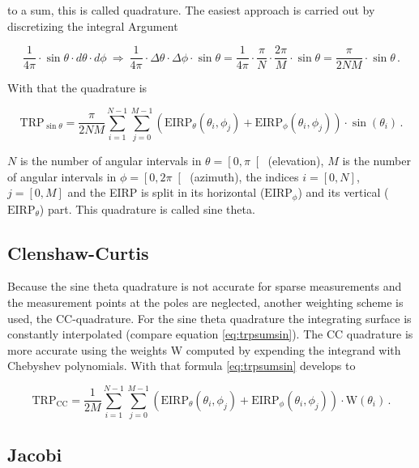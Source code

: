 to a sum, this is called quadrature. The easiest approach is carried out by discretizing the integral Argument \cite{ctiaat}

\begin{equation}
\frac{1}{4\pi}\cdot\sin\theta\cdot d\theta\cdot d\phi \ \Rightarrow\ \frac{1}{4\pi}\cdot \Delta\theta\cdot \Delta\phi\cdot\sin\theta = \frac{1}{4\pi}\cdot \frac{\pi}{N}\cdot \frac{2\pi}{M}\cdot\sin\theta=\frac{\pi}{2NM}\cdot\sin\theta\,.
\end{equation}

With that the quadrature is

\begin{equation}
\text{TRP}_{\sin\theta} = \frac{\pi}{2NM}\sum^{N-1}_{i=1}\sum^{M-1}_{j=0}\left(\text{EIRP}_\theta\left(\theta_i,\phi_j\right)+\text{EIRP}_\phi\left(\theta_i,\phi_j\right)\right)\cdot\sin\left(\theta_i\right)\,.
\label{eq:trpsumsin}
\end{equation}

$N$ is the number of angular intervals in $\theta=\left[0,\pi\right[$ (elevation), $M$ is the number of angular intervals in $\phi=\left[0,2\pi\right[$ (azimuth), the indices $i=\left[0,N\right]$, $j=\left[0,M\right]$ and the \ac{EIRP} is split in its horizontal ($\text{EIRP}_\phi$) and its vertical ($\text{EIRP}_\theta$) part. This quadrature is called sine theta.

\subsection{Clenshaw-Curtis}

Because the sine theta quadrature is not accurate for sparse measurements and the measurement points at the poles are neglected, another weighting scheme is used, the \ac{CC}-quadrature. For the sine theta quadrature the integrating surface is constantly interpolated (compare equation \ref{eq:trpsumsin}). The \ac{CC} quadrature is more accurate using the weights W computed by expending the integrand with Chebyshev polynomials. With that formula \ref{eq:trpsumsin} develops to \cite{trp}

\begin{equation}
\text{TRP}_{\text{CC}} = \frac{1}{2M}\sum^{N-1}_{i=1}\sum^{M-1}_{j=0}\left(\text{EIRP}_\theta\left(\theta_i,\phi_j\right)+\text{EIRP}_\phi\left(\theta_i,\phi_j\right)\right)\cdot\text{W}\left(\theta_i\right)\,.
\label{eq:trpsumcc}
\end{equation}

\subsection{Jacobi}

